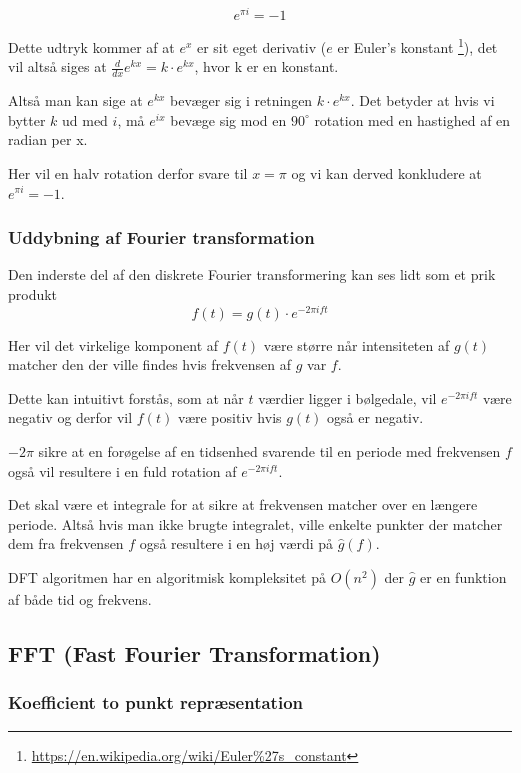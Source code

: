 \documentclass[11pt,a4paper]{article}
\begin{document}
$$
e^{\pi i} = -1
$$

Dette udtryk kommer af at \(e^x\) er sit eget derivativ (\(e\) er Euler's konstant \footnote{\url{https://en.wikipedia.org/wiki/Euler\%27s\_constant}}),
det vil altså siges at \(\frac{d}{dx}e^{kx} = k\cdot e^{kx}\), hvor k er en konstant.

Altså man kan sige at \(e^{kx}\) bevæger sig i retningen \(k \cdot e^{kx}\).
Det betyder at hvis vi bytter \(k\) ud med \(i\), må \(e^{ix}\) bevæge sig mod en \(90^\circ\) rotation med en hastighed af en radian per x.

Her vil en halv rotation derfor svare til \(x=\pi\) og vi kan derved konkludere at \(e^{\pi i} = -1\).

\subsubsection{Uddybning af Fourier transformation}
\label{sec:orge92577e}

Den inderste del af den diskrete Fourier transformering kan ses lidt som et prik produkt
$$
f(t) = g(t) \cdot e ^{-2\pi ift}
$$

Her vil det virkelige komponent af \(f(t)\) være større når intensiteten af \(g(t)\)
matcher den der ville findes hvis frekvensen af \(g\) var \(f\).

Dette kan intuitivt forstås, som at når \(t\) værdier ligger i bølgedale, vil \(e^{-2\pi ift}\) være negativ
og derfor vil \(f(t)\) være positiv hvis \(g(t)\) også er negativ.

\(-2\pi\) sikre at en forøgelse af en tidsenhed svarende til en periode med frekvensen \(f\) også vil resultere
i en fuld rotation af \(e^{-2\pi ift}\).

Det skal være et integrale for at sikre at frekvensen matcher over en længere periode.
Altså hvis man ikke brugte integralet,
ville enkelte punkter der matcher dem fra frekvensen \(f\) også resultere i en høj værdi på \(\hat{g}(f)\).

\bigskip

DFT algoritmen har en algoritmisk kompleksitet på \(O(n^2)\) der \(\hat{g}\) er en funktion af både tid og frekvens.

\newpage

\subsection{FFT (Fast Fourier Transformation)}
\label{sec:org63aef1e}

\subsubsection{Koefficient to punkt repræsentation}
\label{sec:org61740c7}
\end{document}
